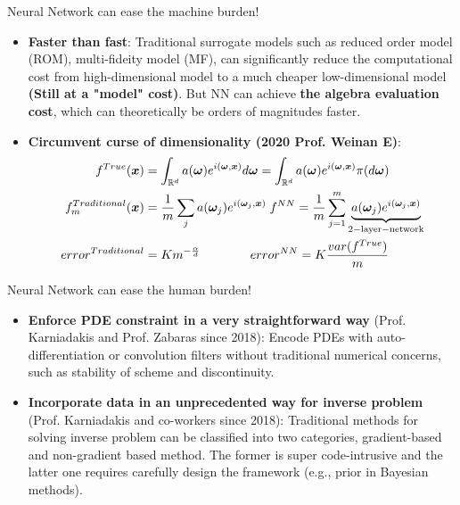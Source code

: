 \documentclass{beamer}
\begin{document}
\begin{frame}{Neural Network can ease the machine burden!}
\begin{itemize}
	\item \textbf{Faster than fast}: Traditional surrogate models such as reduced order model (ROM), multi-fideity model (MF), can significantly reduce the computational cost from high-dimensional model to a much cheaper low-dimensional model \textbf{(Still at a "model" cost)}. But NN can achieve \textbf{the algebra evaluation cost}, which can theoretically be orders of magnitudes faster. 
	\item \textbf{Circumvent curse of dimensionality (2020 Prof. Weinan E)}:
\begin{equation*}
\begin{split}
f^{True}({\bm{x}})&=\int_{\mathbb{R} ^d}a({\boldsymbol{\omega}})e^{i({\boldsymbol{\omega}},{\bm{x}})}d{\boldsymbol{\omega}}=\int_{\mathbb{R} ^d}a({\boldsymbol{\omega}})e^{i({\boldsymbol{\omega}},{\bm{x}})}\pi(d{\boldsymbol{\omega}})\\
f^{Traditional}_m({\bm{x}})&=\frac{1}{m}\sum_j a({\boldsymbol{\omega}}_j)e^{i({\boldsymbol{\omega}}_j,{\bm{x}})}\;f^{NN}=\frac{1}{m}\sum_{j=1}^{m} \underbrace{a({\boldsymbol{\omega}}_j)e^{i({\boldsymbol{\omega}}_j,{\bm{x}})}}_{\mathrm{\small{2-layer-network}}}\\
error^{Traditional}&=Km^{-\frac{\alpha}{d}}\quad\quad\quad\quad error^{NN}=K\frac{var(f^{True})}{m}
\end{split}
\end{equation*}
\end{itemize}
\end{frame}

\begin{frame}{Neural Network can ease the human burden!}
\begin{itemize}
\item \textbf{Enforce PDE constraint in a very straightforward way} (Prof. Karniadakis and Prof. Zabaras since 2018): Encode PDEs with auto-differentiation or convolution filters without traditional numerical concerns, such as stability of scheme and discontinuity.
\item \textbf{Incorporate data in an unprecedented way for inverse problem} (Prof. Karniadakis and co-workers since 2018): Traditional methods for solving inverse problem can be classified into two categories, gradient-based and non-gradient based method. The former is super code-intrusive and the latter one requires carefully design the framework (e.g., prior in Bayesian methods).  
\end{itemize}
\end{frame}
\end{document}
